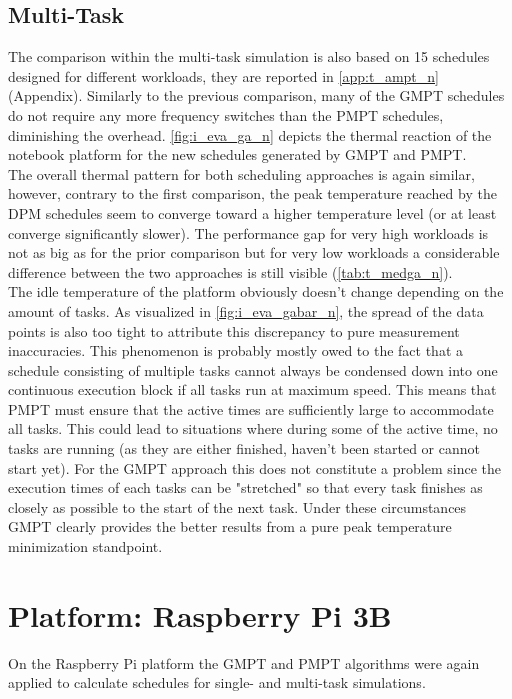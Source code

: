 \subsection{Multi-Task}
The comparison within the multi-task simulation is also based on 15 schedules designed for different workloads, they are reported in \autoref{app:t_ampt_n} (Appendix). Similarly to the previous comparison, many of the GMPT schedules do not require any more frequency switches than the PMPT schedules, diminishing the overhead. \autoref{fig:i_eva_ga_n} depicts the thermal reaction of the notebook platform for the new schedules generated by GMPT and PMPT.\\

The overall thermal pattern for both scheduling approaches is again similar, however, contrary to the first comparison, the peak temperature reached by the DPM schedules seem to converge toward a higher temperature level (or at least converge significantly slower). The performance gap for very high workloads is not as big as for the prior comparison but for very low workloads a considerable difference between the two approaches is still visible (\autoref{tab:t_medga_n}).\\

The idle temperature of the platform obviously doesn't change depending on the amount of tasks. As visualized in \autoref{fig:i_eva_gabar_n}, the spread of the data points is also too tight to attribute this discrepancy to pure measurement inaccuracies. This phenomenon is probably mostly owed to the fact that a schedule consisting of multiple tasks cannot always be condensed down into one continuous execution block if all tasks run at maximum speed. This means that PMPT must ensure that the active times are sufficiently large to accommodate all tasks. This could lead to situations where during some of the active time, no tasks are running (as they are either finished, haven't been started or cannot start yet). For the GMPT approach this does not constitute a problem since the execution times of each tasks can be "stretched" so that every task finishes as closely as possible to the start of the next task. Under these circumstances GMPT clearly provides the better results from a pure peak temperature minimization standpoint.

\section{Platform: Raspberry Pi 3B}
On the Raspberry Pi platform the GMPT and PMPT algorithms were again applied to calculate schedules for single- and multi-task simulations.
